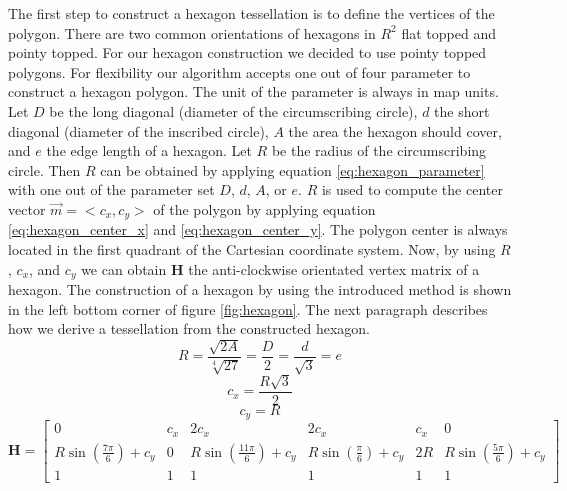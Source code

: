		The first step to construct a hexagon tessellation is to define the vertices of the polygon. There are two common orientations of hexagons in $R^2$ flat topped and pointy topped. For our hexagon construction we decided to use pointy topped polygons. For flexibility our algorithm accepts one out of four parameter to construct a hexagon polygon. The unit of the parameter is always in map units. Let $D$ be the long diagonal (diameter of the circumscribing circle), $d$ the short diagonal (diameter of the inscribed circle), $A$ the area the hexagon should cover, and $e$ the edge length of a hexagon. Let $R$ be the radius of the circumscribing circle. Then $R$ can be obtained by applying equation \ref{eq:hexagon_parameter} with one out of the parameter set $D$, $d$, $A$, or $e$. $R$ is used to compute the center vector $\vec{m}=<c_x, c_y>$ of the polygon by applying equation \ref{eq:hexagon_center_x} and \ref{eq:hexagon_center_y}. The polygon center is always located in the first quadrant of the Cartesian coordinate system. Now, by using $R$, $c_x$, and $c_y$ we can obtain $\mathbf{H}$ the anti-clockwise orientated vertex matrix of a hexagon. The construction of a hexagon by using the introduced method is shown in the left bottom corner of figure \ref{fig:hexagon}. The next paragraph describes how we derive a tessellation from the constructed hexagon.
		\begin{equation}
		\label{eq:hexagon_parameter}
			R = \frac{\sqrt{2A}}{\sqrt[4]{27}} = \frac{D}{2} = \frac{d}{\sqrt{3}} = e
		\end{equation}
		\begin{equation}
		\label{eq:hexagon_center_x}
			c_x = \frac{R\sqrt{3}}{2} 
		\end{equation}
		\begin{equation}
		\label{eq:hexagon_center_y}
			c_y = R
		\end{equation}
		\begin{equation}
		\label{eq:hexagon_matrix}
			\mathbf{H} =
			\begin{bmatrix}
				0 & c_x & 2c_x & 2c_x & c_x & 0 \\
				R\sin\left(\frac{7\pi}{6}\right) + c_y & 0 & R\sin\left(\frac{11\pi}{6}\right)+c_y & R\sin\left(\frac{\pi}{6}\right)+c_y & 2R & R\sin\left(\frac{5\pi}{6}\right)+c_y \\
				1 & 1 & 1 & 1 & 1 & 1
			\end{bmatrix}
		\end{equation}
